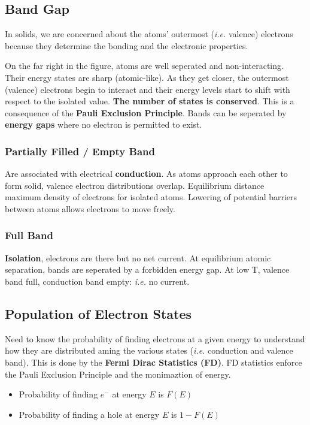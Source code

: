 \documentclass[a4paper, fontsize=8pt, landscape, DIV=1]{scrartcl}
\begin{document}
\begin{multicols*}{4}
  \subsection{Band Gap}
  In solids, we are concerned about the atoms' outermost (\textit{i.e.} valence) electrons because they determine the bonding and the electronic properties.

  On the far right in the figure, atoms are well seperated and non-interacting. 
  Their energy states are sharp (atomic-like). 
  As they get closer, the outermost (valence) electrons begin to interact and their energy levels start to shift with respect to the isolated value. 
  \textbf{The number of states is conserved}. 
  This is a consequence of the \textbf{Pauli Exclusion Principle}. 
  Bands can be seperated by \textbf{energy gaps} where no electron is permitted to exist.

  \subsubsection{Partially Filled / Empty Band}
  Are associated with electrical \textbf{conduction}. 
  As atoms approach each other to form solid, valence electron distributions overlap. 
  Equilibrium distance ~ maximum density of electrons for isolated atoms.  
  Lowering of potential barriers between atoms allows electrons to move freely.

  \subsubsection{Full Band}
  \textbf{Isolation}, electrons are there but no net current. At equilibrium atomic separation, bands are seperated by a forbidden energy gap. At low T, valence band full, conduction band empty: \textit{i.e.} no current.

  \subsection{Population of Electron States}
  Need to know the probability of finding electrons at a given energy to understand how they are distributed aming the various states (\textit{i.e.} conduction and valence band). This is done by the \textbf{Fermi Dirac Statistics (FD)}. FD statistics enforce the Pauli Exclusion Principle and the monimaztion of energy.

  \begin{itemize}
    \item Probability of finding $e^-$ at energy $E$ is $F(E)$
    \item Probability of finding a hole at energy $E$ is $1-F(E)$
  \end{itemize}


\end{multicols*}
\end{document}
